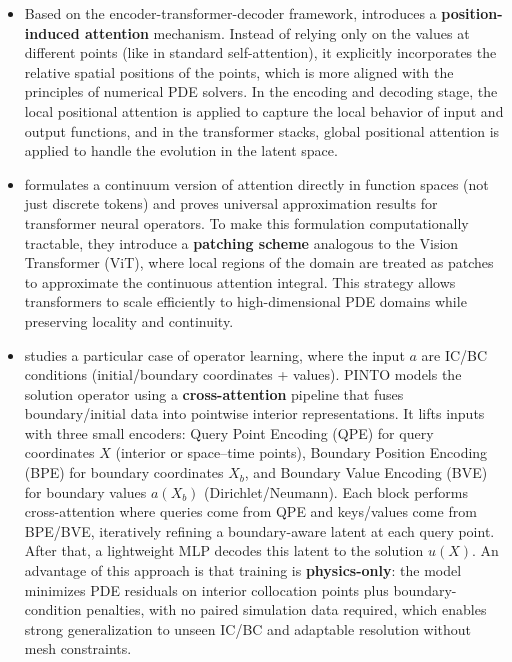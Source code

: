 \documentclass[11pt]{article}
\begin{document}
\begin{itemize}
    \item Based on the encoder-transformer-decoder framework, \cite{chen2024positional} introduces a \textbf{position-induced attention} mechanism. Instead of relying only on the values at different points (like in standard self-attention), it explicitly incorporates the relative spatial positions of the points, which is more aligned with the principles of numerical PDE solvers. In the encoding and decoding stage, the local positional attention is applied to capture the local behavior of input and output functions, and in the transformer stacks, global positional attention is applied to handle the evolution in the latent space.
    
    \item\cite{calvello2024continuum} formulates a continuum version of attention directly in function spaces (not just discrete tokens) and proves universal approximation results for transformer neural operators. To make this formulation computationally tractable, they introduce a \textbf{patching scheme} analogous to the Vision Transformer (ViT), where local regions of the domain are treated as patches to approximate the continuous attention integral. This strategy allows transformers to scale efficiently to high-dimensional PDE domains while preserving locality and continuity.
    
    \item\cite{boya2025pinto} studies a particular case of operator learning, where the input $a$ are IC/BC conditions (initial/boundary coordinates + values). PINTO models the solution operator using a \textbf{cross-attention} pipeline that fuses boundary/initial data into pointwise interior representations. It lifts inputs with three small encoders: Query Point Encoding (QPE) for query coordinates $X$ (interior or space–time points), Boundary Position Encoding (BPE) for boundary coordinates $X_b$, and Boundary Value Encoding (BVE) for boundary values $a(X_b)$ (Dirichlet/Neumann). Each block performs cross-attention where queries come from QPE and keys/values come from BPE/BVE, iteratively refining a boundary-aware latent at each query point. After that, a lightweight MLP decodes this latent to the solution $u(X)$. An advantage of this approach is that training is \textbf{physics-only}: the model minimizes PDE residuals on interior collocation points plus boundary-condition penalties, with no paired simulation data required, which enables strong generalization to unseen IC/BC and adaptable resolution without mesh constraints.
\end{itemize}
\end{document}
